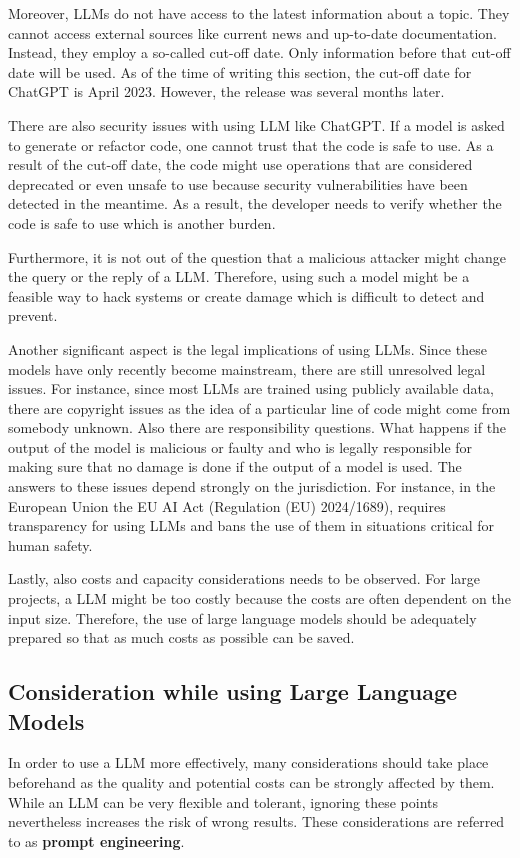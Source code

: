 {Moreover, \ac{LLM}s do not have access to the latest information about a topic. They cannot access external sources like current news and up-to-date documentation. Instead, they employ a so-called cut-off date. Only information before that cut-off date will be used. As of the time of writing this section, the cut-off date for ChatGPT is April  2023. However, the release was several months later.  

There are also security issues with using  \ac{LLM} like ChatGPT. If a model is asked to generate or refactor code, one cannot trust that the code is safe to use. As a result of the cut-off date, the code might use operations that are considered deprecated or even unsafe to use because security vulnerabilities have been detected in the meantime. As a result, the developer needs to verify whether the code is safe to use which is another burden. ~\cite{pearce2021asleep}

Furthermore, it is not out of the question that a malicious attacker might change the query or the reply of a \ac{LLM}. Therefore, using such a model might be a feasible way to hack systems or create damage which is difficult to detect and prevent.~\cite{not_what_you_signed_for}

Another significant aspect is the legal implications of using \acp{LLM}. Since these models have only recently become mainstream, there are still unresolved legal issues. For instance, since most \acp{LLM} are trained using publicly available data, there are copyright issues as the idea of a particular line of code might come from somebody unknown. Also there are responsibility questions. What happens if the output of the model is malicious or faulty and who is legally responsible for making sure that no damage is done if the output of a model is used. The answers to these issues depend strongly on the jurisdiction. For instance, in the European Union the EU AI Act (Regulation (EU) 2024/1689), requires  transparency for using \acp{LLM} and bans the use of them in situations critical for human safety. ~\cite{eu-ai-act}


Lastly, also costs and capacity considerations needs to be observed. For large projects, a \ac{LLM} might be too costly because  the costs are often dependent on the input size. Therefore, the use of large language models should be adequately prepared so that as much costs as possible can be saved. ~\cite{chen2023frugalgpt}




\subsection{Consideration while using Large Language Models}\label{sec:llm_considerations}
In order to use a \ac{LLM} more effectively, many considerations should take place beforehand as the quality and potential costs can be strongly affected by them. While an \ac{LLM} can be very flexible and tolerant, ignoring these points nevertheless increases the risk of wrong results. These considerations are  referred to as \textbf{prompt engineering}. 

}
